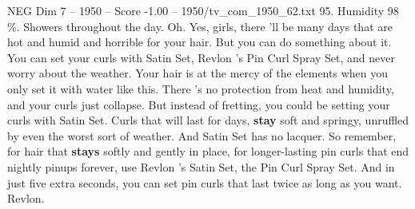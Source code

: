 \begin{textsample}{NEG Dim 7 – 1950 – Score -1.00 – 1950/tv\_com\_1950\_62.txt}  \label{ex:f7_neg_086}
95.
Humidity 98 \%.
Showers throughout the day.
Oh.
Yes, girls, there 'll be many days that are hot and humid and horrible for your hair.
But you can do something about it.
You can set your curls with Satin Set, Revlon 's Pin Curl Spray Set, and never worry about the weather.
Your hair is at the mercy of the elements when you only set it with water like this.
There 's no protection from heat and humidity, and your curls just collapse.
But instead of fretting, you could be setting your curls with Satin Set.
Curls that will last for days, \textbf{stay} soft and springy, unruffled by even the worst sort of weather.
And Satin Set has no lacquer.
So remember, for hair that \textbf{stays} softly and gently in place, for longer-lasting pin curls that end nightly pinups forever, use Revlon 's Satin Set, the Pin Curl Spray Set.
And in just five extra seconds, you can set pin curls that last twice as long as you want.
Revlon.

\end{textsample}
